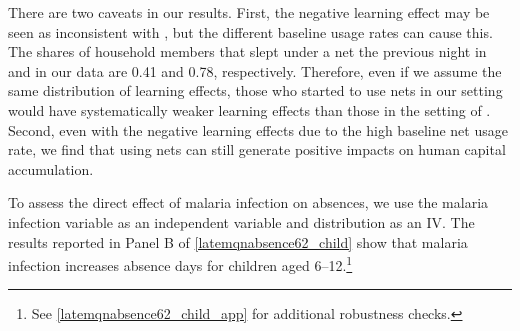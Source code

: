 \documentclass[fleqn,11pt]{article}
\begin{document}
There are two caveats in our results. First, the negative learning effect may be seen as inconsistent with \cite{dupas_short-run_2014}, but the different baseline usage rates can cause this. The shares of household members that slept under a net the previous night in \cite{dupas_getting_2014} and in our data are 0.41 and 0.78, respectively. Therefore, even if we assume the same distribution of learning effects, those who started to use nets in our setting would have systematically weaker learning effects than those in the setting of \cite{dupas_getting_2014}.  Second, even with the negative learning effects due to the high baseline net usage rate, we find that using nets can still generate positive impacts on human capital accumulation. 

To assess the direct effect of malaria infection on absences, we use
the malaria infection variable as an independent variable and distribution as an IV. The
results reported in Panel B of \autoref{latemqnabsence62_child} show that malaria infection increases absence days for children aged 6--12.\footnote{See \autoref{latemqnabsence62_child_app} for additional robustness checks.}

\end{document}
